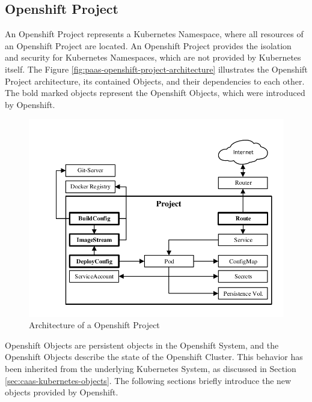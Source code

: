 \subsection{Openshift Project}
\label{sec:paas-openshift-project}
An Openshift Project represents a Kubernetes Namespace, where all resources of an Openshift Project are located. An Openshift Project provides the isolation and security for Kubernetes Namespaces, which are not provided by Kubernetes itself. The Figure \vref{fig:paas-openshift-project-architecture} illustrates the Openshift Project architecture, its contained Objects, and their dependencies to each other. The bold marked objects represent the Openshift Objects, which were introduced by Openshift.
\newpage

\begin{figure}[htbp]
	\centering
	\includegraphics[scale=1]{images/openshift-project-architecture.pdf}
	\caption{Architecture of a Openshift Project}
	\label{fig:paas-openshift-project-architecture}
\end{figure} 

Openshift Objects are persistent objects in the Openshift System, and the Openshift Objects describe the state of the Openshift Cluster. This behavior has been inherited from the underlying Kubernetes System, as discussed in Section \vref{sec:caas-kubernetes-objects}. The following sections briefly introduce the new objects provided by Openshift. 

